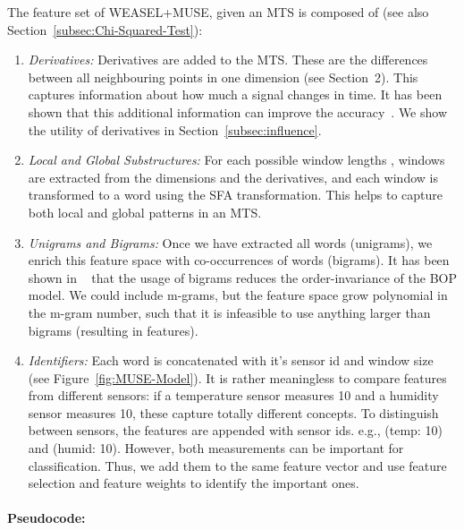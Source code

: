 \documentclass[sigconf]{acmart}
\begin{document}
The feature set of WEASEL+MUSE, given an MTS  is composed of (see also Section~\ref{subsec:Chi-Squared-Test}):
\begin{enumerate}
	\item \emph{Derivatives:} Derivatives are added to the MTS. These are the differences between all neighbouring points in one dimension (see Section~2). This captures information about how much a signal changes in time. It has been shown that this additional information can improve the accuracy~\cite{baydogan2015learning}. We show the utility of derivatives in Section~\ref{subsec:influence}.
			
	\item \emph{Local and Global Substructures:} For each possible window lengths , windows are extracted from the dimensions and the derivatives, and each window is transformed to a word using the SFA transformation. This helps to capture both local and global patterns in an MTS. 
	
	\item \emph{Unigrams and Bigrams:} Once we have extracted all words (unigrams), we enrich this feature space with co-occurrences of words (bigrams). It has been shown in ~\cite{schaefer2017weasel} that the usage of bigrams reduces the order-invariance of the BOP model. We could include m-grams, but the feature space grow polynomial in the m-gram number, such that it is infeasible to use anything larger than bigrams (resulting in  features).
	
	\item \emph{Identifiers:} Each word is concatenated with it's sensor id and window size (see Figure~\ref{fig:MUSE-Model}). It is rather meaningless to compare features from different sensors: if a temperature sensor measures 10 and a humidity sensor measures 10, these capture totally different concepts. To distinguish between sensors, the features are appended with sensor ids. e.g., (temp: 10) and (humid: 10). However, both measurements can be important for classification. Thus, we add them to the same feature vector and use feature selection and feature weights to identify the important ones.
\end{enumerate} 


\paragraph{Pseudocode:}
\end{document}
